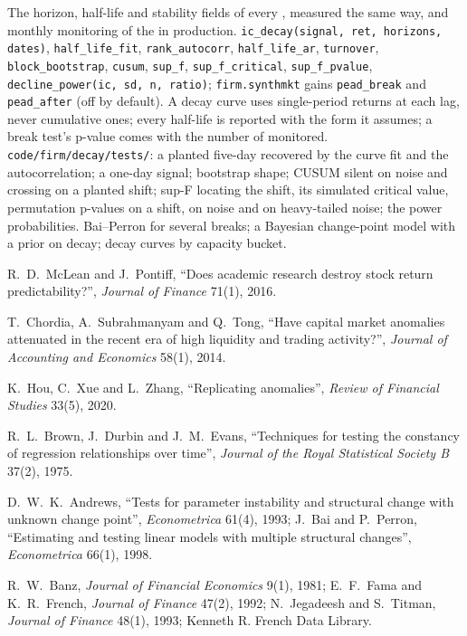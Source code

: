 \begin{build}
 The horizon, half-life and stability fields of every , measured the same way, and monthly monitoring of the
 in production.
 \texttt{ic\_decay(signal, ret, horizons, dates)}, \texttt{half\_life\_fit}, \texttt{rank\_autocorr}, \texttt{half\_life\_ar},
\texttt{turnover}, \texttt{block\_bootstrap}, \texttt{cusum}, \texttt{sup\_f}, \texttt{sup\_f\_critical}, \texttt{sup\_f\_pvalue},
\texttt{decline\_power(ic, sd, n, ratio)}; \texttt{firm.synthmkt} gains \texttt{pead\_break} and \texttt{pead\_after} (off by default).
 A decay curve uses single-period returns at each lag, never cumulative ones; every half-life is reported with the form it assumes;
a break test's p-value comes with the number of  monitored.
 \texttt{code/firm/decay/tests/}: a planted five-day  recovered by the curve fit and the autocorrelation; a
one-day signal; bootstrap shape; CUSUM silent on noise and crossing on a planted shift; sup-F locating the shift, its simulated critical value,
permutation p-values on a shift, on noise and on heavy-tailed noise; the power probabilities.
 Bai--Perron for several breaks; a Bayesian change-point model with a prior on decay; decay curves by capacity bucket.
\end{build}

\begin{omsources}
\item R.~D.~McLean and J.~Pontiff, ``Does academic research destroy stock return predictability?'', \emph{Journal of Finance} 71(1), 2016.
\item T.~Chordia, A.~Subrahmanyam and Q.~Tong, ``Have capital market anomalies attenuated in the recent era of high liquidity and trading
activity?'', \emph{Journal of Accounting and Economics} 58(1), 2014.
\item K.~Hou, C.~Xue and L.~Zhang, ``Replicating anomalies'', \emph{Review of Financial Studies} 33(5), 2020.
\item R.~L.~Brown, J.~Durbin and J.~M.~Evans, ``Techniques for testing the constancy of regression relationships over time'', \emph{Journal of the
Royal Statistical Society B} 37(2), 1975.
\item D.~W.~K.~Andrews, ``Tests for parameter instability and structural change with unknown change point'', \emph{Econometrica} 61(4), 1993;
J.~Bai and P.~Perron, ``Estimating and testing linear models with multiple structural changes'', \emph{Econometrica} 66(1), 1998.
\item R.~W.~Banz, \emph{Journal of Financial Economics} 9(1), 1981; E.~F.~Fama and K.~R.~French, \emph{Journal of Finance} 47(2), 1992;
N.~Jegadeesh and S.~Titman, \emph{Journal of Finance} 48(1), 1993; Kenneth R. French Data Library.
\end{omsources}


